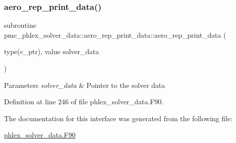\subsubsection{\texorpdfstring{aero\+\_\+rep\+\_\+print\+\_\+data()}{aero\_rep\_print\_data()}}
{\footnotesize\ttfamily subroutine pmc\+\_\+phlex\+\_\+solver\+\_\+data\+::aero\+\_\+rep\+\_\+print\+\_\+data\+::aero\+\_\+rep\+\_\+print\+\_\+data (\begin{DoxyParamCaption}\item[{type(c\+\_\+ptr), value}]{solver\+\_\+data }\end{DoxyParamCaption})\hspace{0.3cm}{\ttfamily [private]}}


\begin{DoxyParams}{Parameters}
{\em solver\+\_\+data} & Pointer to the solver data \\
\hline
\end{DoxyParams}


Definition at line 246 of file phlex\+\_\+solver\+\_\+data.\+F90.



The documentation for this interface was generated from the following file\+:\begin{DoxyCompactItemize}
\item 
\mbox{\hyperlink{phlex__solver__data_8_f90}{phlex\+\_\+solver\+\_\+data.\+F90}}\end{DoxyCompactItemize}
